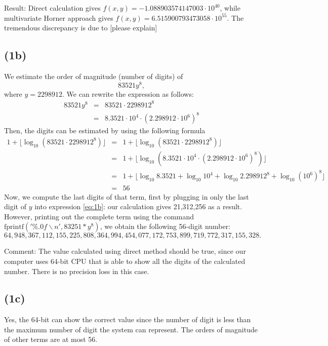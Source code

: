 \documentclass[11pt]{article}
\newcommand{\1}{\mathbbm{1}}
\begin{document}
Result: Direct calculation gives $f(x,y) = -1.088903574147003\cdot 10^{40}$, while multivariate Horner approach gives $f(x,y) = 6.515900793473058\cdot 10^{55}$. The tremendous discrepancy is due to [please explain] 

\subsection*{(1b)}
We estimate the order of magnitude (number of digits) of 
\begin{equation}\label{eq:1b}
83521y^8,
\end{equation}
where $y=2298912$. We can rewrite the expression as follows:
	\begin{eqnarray*}
		83521y^8 &=& 83521\cdot 2298912^8\\
				 &=& 8.3521\cdot10^4 \cdot (2.298912\cdot10^6)^8
	\end{eqnarray*}
Then, the digits can be estimated by using the following formula 
	\begin{eqnarray*}
		1+\lfloor \log_{10} (83521\cdot 2298912^8)\rfloor &=& 1+\lfloor \log_{10} (83521\cdot 2298912^8)\rfloor\\
		&=&  1+\lfloor \log_{10} (8.3521\cdot10^4 \cdot (2.298912\cdot10^6)^8)\rfloor\\
			&=&  1+\lfloor \log_{10} 8.3521+\log_{10}10^4 + \log_{10}2.298912^8 +\log_{10} (10^6)^8\rfloor\\
			&=& 56
	\end{eqnarray*} 
Now, we compute the last digits of that term, first by plugging in only the last digit of $y$ into expression \eqref{eq:1b}: our calculation gives 21,312,256 as a result. However, printing out the complete term using the command $\text{fprintf}('\%.0f\backslash n',83251*y^8)$, we obtain the following 56-digit number:
\[64,948,367,112,155,225,808,364,994,454,077,172,753,899,719,772,317,155,328.\] 

Comment: The value calculated using direct method should be true, since our computer uses 64-bit CPU that is able to show all the digits of the calculated number. There is no precision loss in this case.

\subsection*{(1c)}
Yes, the 64-bit can show the correct value since the number of digit is less than the maximum number of digit the system can represent. The orders of magnitude of other terms are at most 56. 
\end{document}
